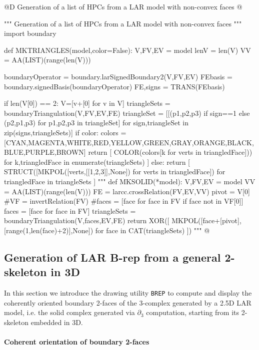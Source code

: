 \documentclass[11pt,oneside]{article}    %
\begin{document}
@D Generation of a list of HPCs from a LAR model with non-convex faces
@{""" Generation of a list of HPCs from a LAR model with non-convex faces """
import boundary

def MKTRIANGLES(model,color=False):
    V,FV,EV = model
    lenV = len(V)
    VV = AA(LIST)(range(len(V)))
    
    boundaryOperator = boundary.larSignedBoundary2(V,FV,EV)
    FEbasis = boundary.signedBasis(boundaryOperator)
    FE,signs = TRANS(FEbasis)
    
    if len(V[0]) == 2: V=[v+[0] for v in V]
    triangleSets = boundaryTriangulation(V,FV,EV,FE)
    triangleSet = [[(p1,p2,p3) if sign==1 else (p2,p1,p3) for p1,p2,p3 in triangleSet] 
                    for sign,triangleSet in zip(signs,triangleSets)]
    if color:
        colors = [CYAN,MAGENTA,WHITE,RED,YELLOW,GREEN,GRAY,ORANGE,BLACK,BLUE,PURPLE,BROWN]
        return [ COLOR(colors[k%
            for verts in triangledFace])) for k,triangledFace in enumerate(triangleSets) ]
    else:
        return [ STRUCT([MKPOL([verts,[[1,2,3]],None]) for verts in triangledFace])
                for triangledFace in triangleSets ]
"""
def MKSOLID(*model): 
    V,FV,EV = model
    VV = AA(LIST)(range(len(V)))
    FE = larcc.crossRelation(FV,EV,VV)
    pivot = V[0]
    #VF = invertRelation(FV) 
    #faces = [face for face in FV if face not in VF[0]]
    faces = [face for face in FV]
    triangleSets = boundaryTriangulation(V,faces,EV,FE)
    return XOR([ MKPOL([face+[pivot], [range(1,len(face)+2)],None])
        for face in CAT(triangleSets) ])
"""
@}


\subsection{Generation of LAR B-rep from a general 2-skeleton in 3D}

In this section we introduce the drawing utility \texttt{BREP} to compute and display the coherently oriented boundary 2-faces of the 3-complex generated by a 2.5D LAR model, i.e. the solid complex generated via $\partial_3$ computation, starting from its 2-skeleton embedded in 3D.

\paragraph{Coherent orientation of boundary 2-faces}
\end{document}
